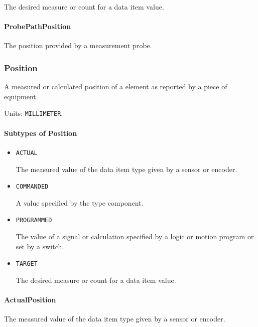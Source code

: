 The desired measure or count for a data item value.


\paragraph{ProbePathPosition}\mbox{}
\label{sec:ProbePathPosition}


The position provided by a measurement probe.


\subsubsection{Position}
\label{sec:Position}



A measured or calculated position of a  element as reported by a piece of equipment.


Units: \texttt{MILLIMETER}.

\paragraph{Subtypes of Position}\mbox{}
\label{sec:Subtypes of Position}

\begin{itemize}

\item \texttt{ACTUAL}


The measured value of the data item type given by a sensor or encoder.

\item \texttt{COMMANDED}


A value specified by the  type component.

\item \texttt{PROGRAMMED}


The value of a signal or calculation specified by a logic or motion program or set by a switch.

\item \texttt{TARGET}


The desired measure or count for a data item value.


\end{itemize}

\paragraph{ActualPosition}\mbox{}
\label{sec:ActualPosition}


The measured value of the data item type given by a sensor or encoder.



